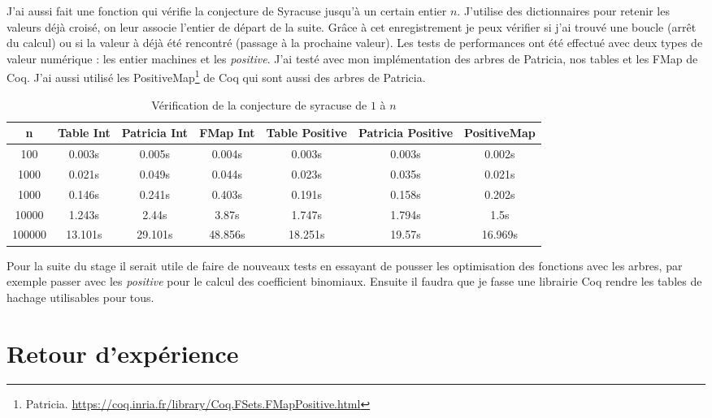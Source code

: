 \documentclass{article}
\begin{document}
  J'ai aussi fait une fonction qui vérifie la conjecture de Syracuse
jusqu'à un certain entier $n$. J'utilise des dictionnaires pour retenir les
valeurs déjà croisé, on leur associe l'entier de départ de la suite. Grâce à cet
enregistrement je peux vérifier si j'ai trouvé une boucle (arrêt du
calcul) ou si la valeur à déjà été rencontré (passage à la prochaine valeur).
Les tests de performances ont été effectué avec deux types de valeur numérique :
les entier machines et les \textit{positive}. J'ai testé avec mon implémentation
des arbres de Patricia, nos tables et les FMap de Coq. J'ai aussi utilisé les
PositiveMap\footnote{Patricia. \url{https://coq.inria.fr/library/Coq.FSets.FMapPositive.html}}
de Coq qui sont aussi des arbres de Patricia.

\begin{table}[h!]
  \centering
  \begin{tabular}{c|c c c c c c}
    n & Table Int & Patricia Int & FMap Int & Table Positive & Patricia Positive & PositiveMap \\
    \hline
    100     & 0.003s & 0.005s   & 0.004s  & 0.003s  & 0.003s & 0.002s  \\
    1000    & 0.021s & 0.049s   & 0.044s  & 0.023s  & 0.035s & 0.021s  \\
    1000    & 0.146s & 0.241s   & 0.403s  & 0.191s  & 0.158s & 0.202s  \\
    10000   & 1.243s & 2.44s    & 3.87s   & 1.747s  & 1.794s & 1.5s    \\
    100000  & 13.101s & 29.101s & 48.856s & 18.251s & 19.57s & 16.969s \\
  \end{tabular}
  \caption{Vérification de la conjecture de syracuse de $1$ à $n$}
\end{table}

  Pour la suite du stage il serait utile de faire de nouveaux tests en essayant
de pousser les optimisation des fonctions avec les arbres, par exemple passer
avec les \textit{positive} pour le calcul des coefficient binomiaux. Ensuite il
faudra que je fasse une librairie Coq rendre les tables de hachage utilisables
pour tous.

  \newpage
  \section{Retour d'expérience}
\end{document}
